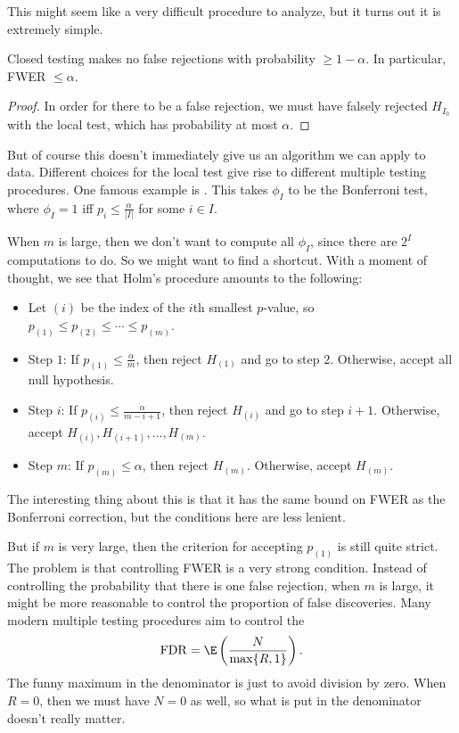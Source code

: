 \documentclass[a4paper]{article}
\begin{document}
This might seem like a very difficult procedure to analyze, but it turns out it is extremely simple.
\begin{thm}
  Closed testing makes no false rejections with probability $\geq 1 - \alpha$. In particular, FWER $\leq \alpha$.
\end{thm}

\begin{proof}
  In order for there to be a false rejection, we must have falsely rejected $H_{I_0}$ with the local test, which has probability at most $\alpha$.
\end{proof}

But of course this doesn't immediately give us an algorithm we can apply to data. Different choices for the local test give rise to different multiple testing procedures. One famous example is . This takes $\phi_I$ to be the Bonferroni test, where $\phi_I = 1$ iff $p_i \leq \frac{\alpha}{|I|}$ for some $i \in I$.

When $m$ is large, then we don't want to compute all $\phi_I$, since there are $2^I$ computations to do. So we might want to find a shortcut. With a moment of thought, we see that Holm's procedure amounts to the following:
\begin{itemize}
  \item Let $(i)$ be the index of the $i$th smallest $p$-value, so $p_{(1)} \leq p_{(2)} \leq \cdots \leq p_{(m)}$.
  \item Step $1$: If $p_{(1)} \leq \frac{\alpha}{m}$, then reject $H_{(1)}$ and go to step $2$. Otherwise, accept all null hypothesis.
  \item Step $i$: If $p_{(i)} \leq \frac{\alpha}{m - i + 1}$, then reject $H_{(i)}$ and go to step $i + 1$. Otherwise, accept $H_{(i)}, H_{(i + 1)}, \ldots, H_{(m)}$.
  \item Step $m$: If $p_{(m)} \leq \alpha$, then reject $H_{(m)}$. Otherwise, accept $H_{(m)}$.
\end{itemize}
The interesting thing about this is that it has the same bound on FWER as the Bonferroni correction, but the conditions here are less lenient.

But if $m$ is very large, then the criterion for accepting $p_{(1)}$ is still quite strict. The problem is that controlling FWER is a very strong condition. Instead of controlling the probability that there is one false rejection, when $m$ is large, it might be more reasonable to control the proportion of false discoveries. Many modern multiple testing procedures aim to control the 
\[
  \mathrm{FDR} = \E\left(\frac{N}{\max \{R, 1\}}\right).
\]
The funny maximum in the denominator is just to avoid division by zero. When $R = 0$, then we must have $N = 0$ as well, so what is put in the denominator doesn't really matter.
\end{document}
